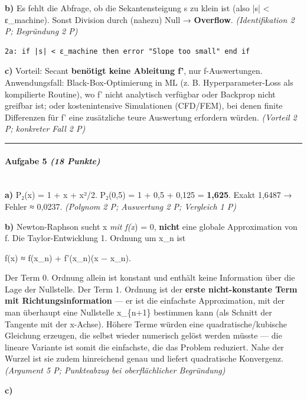 \documentclass[11pt, a4paper]{article}
\begin{document}
\textbf{b)} Es fehlt die Abfrage, ob die Sekantensteigung s zu klein ist (also |s| < ε\_machine). Sonst Division durch (nahezu) Null → \textbf{Overflow}. \textit{(Identifikation 2 P; Begründung 2 P)}


\begin{lstlisting}
2a: if |s| < ε_machine then error "Slope too small" end if
\end{lstlisting}


\textbf{c)} Vorteil: Secant \textbf{benötigt keine Ableitung f'}, nur f-Auswertungen. Anwendungsfall: Black-Box-Optimierung in ML (z. B. Hyperparameter-Loss als kompilierte Routine), wo f' nicht analytisch verfügbar oder Backprop nicht greifbar ist; oder kostenintensive Simulationen (CFD/FEM), bei denen finite Differenzen für f' eine zusätzliche teure Auswertung erfordern würden. \textit{(Vorteil 2 P; konkreter Fall 2 P)}



\noindent\textcolor{rulegray}{\rule{\linewidth}{0.4pt}}


\paragraph{Aufgabe 5 \textit{(18 Punkte)}}\mbox{}\\[2pt]

\textbf{a)} P₂(x) = 1 + x + x²/2. P₂(0,5) = 1 + 0,5 + 0,125 = \textbf{1,625}. Exakt 1,6487 → Fehler ≈ 0,0237. \textit{(Polynom 2 P; Auswertung 2 P; Vergleich 1 P)}


\textbf{b)} Newton-Raphson sucht x\textit{ mit f(x}) = 0, \textbf{nicht} eine globale Approximation von f. Die Taylor-Entwicklung 1. Ordnung um x\_n ist

f(x) ≈ f(x\_n) + f'(x\_n)(x − x\_n).

Der Term 0. Ordnung allein ist konstant und enthält keine Information über die Lage der Nullstelle. Der Term 1. Ordnung ist der \textbf{erste nicht-konstante Term mit Richtungsinformation} — er ist die einfachste Approximation, mit der man überhaupt eine Nullstelle x\_\{n+1\} bestimmen kann (als Schnitt der Tangente mit der x-Achse). Höhere Terme würden eine quadratische/kubische Gleichung erzeugen, die selbst wieder numerisch gelöst werden müsste — die lineare Variante ist somit die einfachste, die das Problem reduziert. Nahe der Wurzel ist sie zudem hinreichend genau und liefert quadratische Konvergenz. \textit{(Argument 5 P; Punkteabzug bei oberflächlicher Begründung)}


\textbf{c)}
\end{document}
